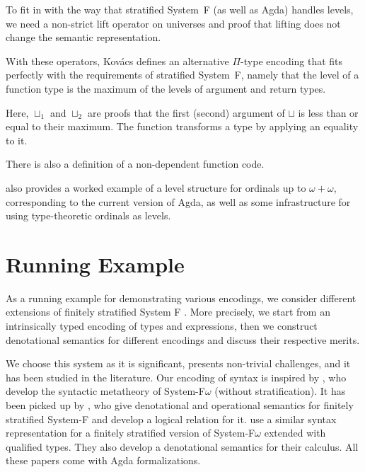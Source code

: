 \documentclass[manuscript,screen,review,anonymous]{acmart}
\begin{document}
To fit in with the way that stratified System~F (as well as Agda)
handles levels, we need a non-strict lift operator on universes and
proof that lifting does not change the semantic representation.

\begin{minipage}{0.45\linewidth}
  \ULiftLe
\end{minipage}
\begin{minipage}{0.45\linewidth}
  \UElLiftLe
\end{minipage}

With these operators, Kov\'{a}cs defines an alternative $\Pi$-type encoding that fits perfectly
with the requirements of stratified System~F, namely that the level of
a function type is the maximum of the levels of argument and return types.
\UAltPi

Here, $\sqcup_1$ and $\sqcup_2$ are proofs that the first (second)
argument of $\sqcup$ is less than or equal to their maximum. The
function {\Acoe} transforms a type by applying an equality to it.

There is also a definition of a non-dependent function code.

\UFun

\citet{DBLP:conf/csl/Kovacs22} also provides a worked example of a
level structure for ordinals up to $\omega+\omega$, corresponding to
the current version of Agda, as well as some infrastructure for
using type-theoretic ordinals as levels.

\section{Running Example}
\label{sec:running-example}

As a running example for demonstrating various encodings, we consider
different extensions of finitely stratified System F
\cite{DBLP:journals/iandc/Leivant91}. More precisely, we start from an
intrinsically typed encoding of types and expressions, then we
construct denotational semantics for different encodings and discuss
their respective merits.

We choose this system as it is significant, presents non-trivial
challenges, and it has been studied in the literature. Our encoding of
syntax is inspired by \citet{DBLP:conf/mpc/ChapmanKNW19}, who develop
the syntactic metatheory of System-F$\omega$ (without
stratification). It has been  picked up by
\citet{DBLP:conf/tyde/Saffrich0W24}, who give denotational and operational semantics
for finitely stratified System-F and develop a logical relation for
it. \citet{DBLP:journals/pacmpl/HubersM23} use a similar syntax
representation for a finitely stratified version of System-F$\omega$
extended with qualified types. They also develop a denotational
semantics for their calculus. All these papers come with Agda
formalizations. 
\end{document}
